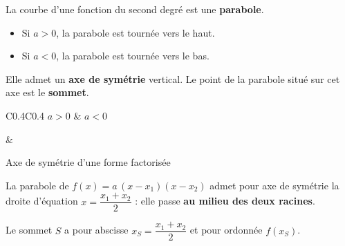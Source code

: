 \documentclass[12pt]{article}
\theoremstyle{break}
\theoremstyle{inline}
\begin{document}
\begin{proposition}{}{}
  \begin{multihide}
    La courbe d'une fonction du second degré est une \textbf{parabole}.
    \begin{itemize}
      \item Si $a > 0$, la parabole est tournée vers le haut.
      \item Si $a < 0$, la parabole est tournée vers le bas.
    \end{itemize}
    Elle admet un \textbf{axe de symétrie} vertical. Le point de la parabole situé sur cet axe est le \textbf{sommet}.
  \end{multihide}
\end{proposition}

\begin{center}
  \begin{tabular}{C{0.4\linewidth}C{0.4\linewidth}}
    $a > 0$ & $a < 0$ \\[0.3em]
    &
  \end{tabular}
\end{center}

\begin{proposition}{Axe de symétrie d'une forme factorisée}{}
  \begin{multihide}
    La parabole de $f(x) = a\,(x - x_1)(x - x_2)$ admet pour axe de symétrie la droite d'équation $x = \dfrac{x_1 + x_2}{2}$ : elle passe \textbf{au milieu des deux racines}.

    Le sommet $S$ a pour abscisse $x_S = \dfrac{x_1 + x_2}{2}$ et pour ordonnée $f(x_S)$.
  \end{multihide}
\end{proposition}
\end{document}
